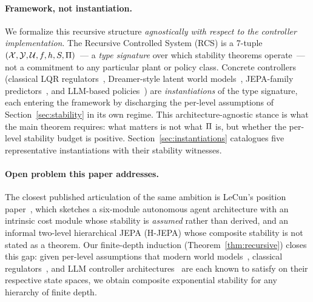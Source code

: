 \documentclass[11pt,a4paper]{article}
\begin{document}
\paragraph{Framework, not instantiation.}
We formalize this recursive structure \emph{agnostically with respect to
the controller implementation}.  The Recursive Controlled System (RCS)
is a 7-tuple
$(\mathcal{X}, \mathcal{Y}, \mathcal{U}, f, h, S, \Pi)$~--- a \emph{type signature}
over which stability theorems operate~--- not a commitment to any
particular plant or policy class.  Concrete controllers (classical LQR
regulators~\cite{khalil2002nonlinear}, Dreamer-style latent world
models~\cite{hafner2025dreamerv3}, JEPA-family
predictors~\cite{assran2025vjepa2}, and LLM-based
policies~\cite{bhargava2023magic,soatto2023taming}) are
\emph{instantiations} of the type signature, each entering the
framework by discharging the per-level assumptions of
Section~\ref{sec:stability} in its own regime.  This
architecture-agnostic stance is what the main theorem requires: what
matters is not what $\Pi$ is, but whether the per-level stability
budget is positive.  Section~\ref{sec:instantiations} catalogues five
representative instantiations with their stability witnesses.

\paragraph{Open problem this paper addresses.}
The closest published articulation of the same ambition is LeCun's
position paper~\cite{lecun2022path}, which sketches a six-module
autonomous agent architecture with an intrinsic cost module whose
stability is \emph{assumed} rather than derived, and an informal
two-level hierarchical JEPA (H-JEPA) whose composite stability is not
stated as a theorem.  Our finite-depth induction
(Theorem~\ref{thm:recursive}) closes this gap: given per-level
assumptions that modern world models~\cite{hafner2025dreamerv3,
assran2025vjepa2}, classical regulators~\cite{khalil2002nonlinear}, and
LLM controller architectures~\cite{bhargava2023magic,soatto2023taming,
wang2026agentspec} are each known to satisfy on their respective state
spaces, we obtain composite exponential stability for any hierarchy of
finite depth.
\end{document}
